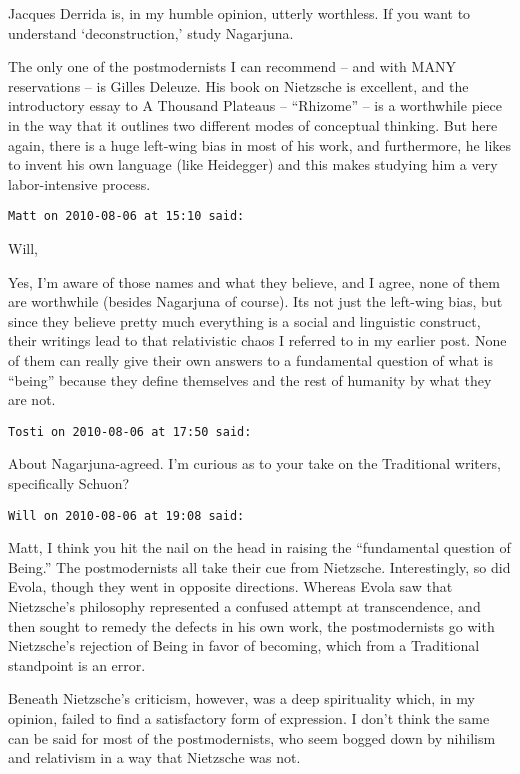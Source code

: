 \begin{footnotesize}
\begin{sffamily}
Jacques Derrida is, in my humble opinion, utterly worthless. If you want to understand `deconstruction,' study Nagarjuna.

The only one of the postmodernists I can recommend – and with MANY reservations – is Gilles Deleuze. His book on Nietzsche is excellent, and the introductory essay to A Thousand Plateaus – “Rhizome” – is a worthwhile piece in the way that it outlines two different modes of conceptual thinking. But here again, there is a huge left-wing bias in most of his work, and furthermore, he likes to invent his own language (like Heidegger) and this makes studying him a very labor-intensive process.


\hfill

\texttt{Matt on 2010-08-06 at 15:10 said: }

Will,

Yes, I'm aware of those names and what they believe, and I agree, none of them are worthwhile (besides Nagarjuna of course). Its not just the left-wing bias, but since they believe pretty much everything is a social and linguistic construct, their writings lead to that relativistic chaos I referred to in my earlier post. None of them can really give their own answers to a fundamental question of what is “being” because they define themselves and the rest of humanity by what they are not.


\hfill

\texttt{Tosti on 2010-08-06 at 17:50 said: }

About Nagarjuna-agreed. I'm curious as to your take on the Traditional writers, specifically Schuon?


\hfill

\texttt{Will on 2010-08-06 at 19:08 said: }

Matt, I think you hit the nail on the head in raising the “fundamental question of Being.” The postmodernists all take their cue from Nietzsche. Interestingly, so did Evola, though they went in opposite directions. Whereas Evola saw that Nietzsche's philosophy represented a confused attempt at transcendence, and then sought to remedy the defects in his own work, the postmodernists go with Nietzsche's rejection of Being in favor of becoming, which from a Traditional standpoint is an error.

Beneath Nietzsche's criticism, however, was a deep spirituality which, in my opinion, failed to find a satisfactory form of expression. I don't think the same can be said for most of the postmodernists, who seem bogged down by nihilism and relativism in a way that Nietzsche was not.



\end{sffamily}
\end{footnotesize}
